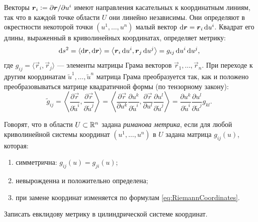 Векторы $\vec{r}_i \vcentcolon = \partial \vec{r} / \partial u^i$ имеют направления касательных к координатным линиям, так что в каждой точке области $U$ они линейно независимы. Они определяют в окрестности некоторой точки $(u^1, \ldots, u^n)$ малый вектор $\d\vec{r} = \vec{r}_i\d u^i$. Квадрат его длины, выраженный в криволинейных координатах, определяет метрику:
\[
	\d s^2 = \langle \d\vec{r}, \d\vec{r}\rangle = \left\langle\vec{r}_i\d u^i, \vec{r}_j\d u^j\right\rangle = g_{ij}\d u^i\d u^j,
\]
где $g_{ij} = \langle\vec{r}_i, \vec{r}_j\rangle$ --- элементы матрицы Грама векторов $\vec{r}_1, \ldots, \vec{r}_n$. При переходе к другим координатам $\widetilde{u}^1, \ldots, \widetilde{u}^n$ матрица Грама преобразуется так, как и положено преобразовываться матрице квадратичной формы (по тензорному закону):
\begin{equation} \label{eq:RiemannCoordinates}
	\widetilde{g}_{ij} = \left\langle\frac{\partial \vec{r}}{\partial\widetilde{u}^i}, \frac{\partial \vec{r}}{\partial\widetilde{u}^j}\right\rangle = \left\langle\frac{\partial \vec{r}}{\partial u^k}\frac{\partial u^k}{\partial\widetilde{u}^i}, \frac{\partial \vec{r}}{\partial u^l}\frac{\partial u^l}{\partial\widetilde{u}^j}\right\rangle = \frac{\partial u^k}{\partial\widetilde{u}^i}\frac{\partial u^l}{\partial\widetilde{u}^j}g_{kl}.
\end{equation}

\begin{definition} \label{definition:RiemannMetrics}
	Говорят, что в области $U \subset \R^n$ задана \textit{риманова метрика}, если для любой криволинейной системы координат $(u^1, \ldots, u^n)$ в $U$ задана матрица $g_{ij}(u)$, которая:
	\begin{enumerate}[nolistsep, label=(\arabic*)]
		\item симметрична: $g_{ij}(u) = g_{ji}(u)$;
		\item невырожденна и положительно определена;
		\item при замене координат изменяется по формулам \eqref{eq:RiemannCoordinates}.
	\end{enumerate}
\end{definition}

\begin{problem} \label{problem:CylindricalMetric}
	Записать евклидову метрику в цилиндрической системе координат.
\end{problem}

